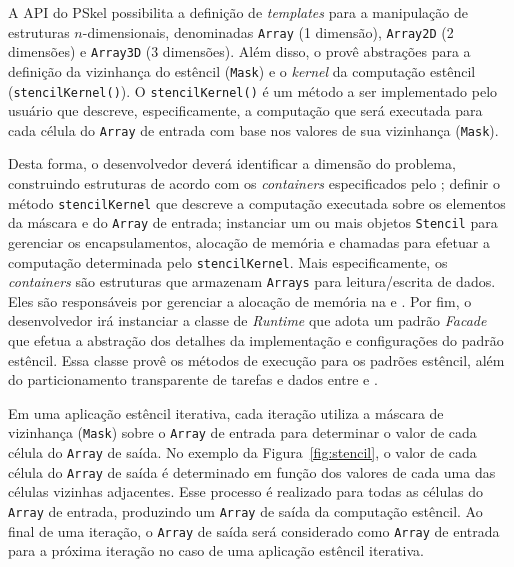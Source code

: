 A API do PSkel possibilita a definição de \textit{templates} para a manipulação
de estruturas $n$-dimensionais, denominadas \texttt{Array} (1 dimensão),
\texttt{Array2D} (2 dimensões) e \texttt{Array3D} (3 dimensões). Além disso, o
\fw provê abstrações para a definição da vizinhança do estêncil (\texttt{Mask})
e o \textit{kernel} da computação estêncil (\texttt{stencilKernel()}). O
\texttt{stencilKernel()} é um método a ser implementado pelo usuário que
descreve, especificamente, a computação que será executada para cada célula do
\texttt{Array} de entrada com base nos valores de sua vizinhança (\texttt{Mask}).

Desta forma, o desenvolvedor deverá identificar a dimensão do problema,
construindo estruturas de acordo com os \textit{containers} especificados pelo
\fw; definir o método \texttt{stencilKernel} que descreve a computação executada
sobre os elementos da máscara e do \texttt{Array} de entrada; instanciar um ou
mais objetos \texttt{Stencil} para gerenciar os encapsulamentos, alocação de
memória e chamadas para efetuar a computação determinada pelo
\texttt{stencilKernel}. Mais especificamente, os \textit{containers} são
estruturas que armazenam \texttt{Arrays} para leitura/escrita de dados. Eles são
responsáveis por gerenciar a alocação de memória na \cpu e \gpu.
Por fim, o desenvolvedor irá instanciar a classe de \textit{Runtime} que adota
um padrão \textit{Facade} que efetua a abstração dos detalhes da implementação e
configurações do padrão estêncil. Essa classe provê os métodos de execução para
os padrões estêncil, além do particionamento transparente de tarefas e dados
entre \cpu e \gpu.

%
Em uma aplicação estêncil iterativa, cada iteração utiliza a máscara de
vizinhança (\texttt{Mask}) sobre o \texttt{Array} de entrada para determinar o
valor de cada célula do \texttt{Array} de saída. No exemplo da
Figura~\ref{fig:stencil}, o valor de cada célula do \texttt{Array} de saída é
determinado em função dos valores de cada uma das células vizinhas adjacentes.
Esse processo é realizado para todas as células do \texttt{Array} de entrada,
produzindo um \texttt{Array} de saída da computação estêncil. Ao final de uma
iteração, o \texttt{Array} de saída será considerado como \texttt{Array} de
entrada para a próxima iteração no caso de uma aplicação estêncil iterativa.

